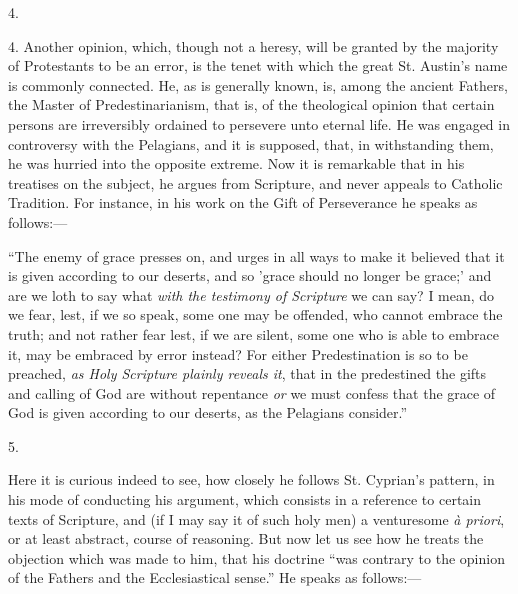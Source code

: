 4.

4. Another opinion, which, though not a heresy, will be granted by
the majority of Protestants to be an error, is the tenet with which
the great St. Austin's name is commonly connected. He, as is generally
known, is, among the ancient Fathers, the Master of Predestinarianism,
that is, of the theological opinion that certain persons are
irreversibly ordained to persevere unto eternal life. He was engaged
in controversy with the Pelagians, and it is supposed, that, in
withstanding them, he was hurried into the opposite extreme. Now it is
remarkable that in his treatises on the subject, he argues from
Scripture, and never appeals to Catholic Tradition. For instance, in
his work on the Gift of Perseverance he speaks as follows:—

``The enemy of grace presses on, and urges in all ways to make
it believed that it is given according to our deserts, and so 'grace
should no longer be grace;' and are we loth to say what \emph{with the
testimony of Scripture} we can say? I mean, do we fear, lest, if we
so speak, some one may be offended, who cannot embrace the truth; and
not rather fear lest, if we are silent, some one who is able to
embrace it, may be embraced by error instead? For either
Predestination is so to be preached, \emph{as Holy Scripture
plainly reveals it}, that in the predestined the gifts and calling
of God are without repentance \emph{or} we must confess that the grace
of God is given according to our deserts, as the Pelagians
consider.''

5.

Here it is curious indeed to see, how closely he follows St.
Cyprian's pattern, in his mode of conducting his argument, which
consists in a reference to certain texts of Scripture, and (if I may
say it of such holy men) a venturesome \emph{à priori}, or at least
abstract, course of reasoning. But now let us see how he treats the
objection which was made to him, that his doctrine ``was contrary
to the opinion of the Fathers and the Ecclesiastical sense.'' He
speaks as follows:—

